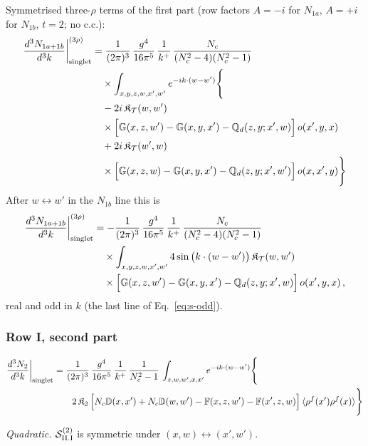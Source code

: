 \documentclass[9pt]{article}
\def\mf#1{\mathbb{#1}}
\numberwithin{equation}{section}
\begin{document}
{ Symmetrised three-$\rho$ terms of the first part (row factors $A=-i$ for $N_{1a}$, $A=+i$ for $N_{1b}$, $t=2$; no c.c.):
\begin{align}
\frac{d^{3}N_{1a+1b}}{d^{3}k}\bigg|^{(3\rho)}_{\rm singlet}&=\frac{1}{(2\pi)^{3}}\,\frac{g^{4}}{16\pi^{5}}\,\frac{1}{k^{+}}\,\frac{N_{c}}{(N_{c}^{2}-4)(N_{c}^{2}-1)}\notag\\
&\quad\times\int_{x,y,z,w,x',w'}e^{-ik\cdot(w-w')}\Bigg\{\notag\\
&\quad-2i\,\mathfrak{K}_{\mathcal{T}}(w,w')\notag\\
&\quad\times\Big[\mf{G}(x,z,w')-\mf{G}(x,y,x')-\mf{Q}_{d}(z,y;x',w)\Big]\,o(x',y,x)\notag\\
&\quad+2i\,\mathfrak{K}_{\mathcal{T}}(w',w)\notag\\
&\quad\times\Big[\mf{G}(x,z,w)-\mf{G}(x,y,x')-\mf{Q}_{d}(z,y;x',w')\Big]\,o(x,x',y)\Bigg\}\label{eq:s-o-II-I-1}
\end{align}
After $w\leftrightarrow w'$ in the $N_{1b}$ line this is
\begin{align}
\frac{d^{3}N_{1a+1b}}{d^{3}k}\bigg|^{(3\rho)}_{\rm singlet}&=-\frac{1}{(2\pi)^{3}}\,\frac{g^{4}}{16\pi^{5}}\,\frac{1}{k^{+}}\,\frac{N_{c}}{(N_{c}^{2}-4)(N_{c}^{2}-1)}\notag\\
&\quad\times\int_{x,y,z,w,x',w'}4\sin\big(k\cdot(w-w')\big)\,\mathfrak{K}_{\mathcal{T}}(w,w')\notag\\
&\quad\times\Big[\mf{G}(x,z,w')-\mf{G}(x,y,x')-\mf{Q}_{d}(z,y;x',w)\Big]\,o(x',y,x)\,,\label{eq:s-o-II-I-1sin}
\end{align}
real and odd in $k$ (the last line of Eq.~\eqref{eq:s-odd}).
\subsubsection*{Row I, second part}

\begin{align}
\frac{d^{3}N_{2}}{d^{3}k}\bigg|_{\rm singlet}&=\frac{1}{(2\pi)^{3}}\,\frac{g^{4}}{16\pi^{5}}\,\frac{1}{k^{+}}\,\frac{1}{N_{c}^{2}-1}\,\int_{z,w,w',x,x'}e^{-ik\cdot(w-w')}\Bigg\{\notag\\
&\qquad 2\,\mathfrak{K}_{2}\,\Big[N_{c}\mf{D}(x,x')+N_{c}\mf{D}(w,w')-\mf{F}(x,z,w')-\mf{F}(x',z,w)\Big]\,\langle\rho^{f}(x')\rho^{f}(x)\rangle\Bigg\}\label{eq:s-II-I-2}
\end{align}

\emph{Quadratic.} $\mathcal{S}^{(2)}_{\rm II.I}$ is symmetric under $(x,w)\leftrightarrow(x',w')$.
}
\end{document}

